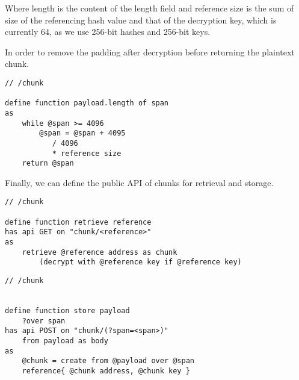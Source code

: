 Where length is the content of the length field and reference  size is the sum of size of the referencing hash value and that of the decryption key, which is currently 64, as we use 256-bit hashes and 256-bit keys.

In order to remove the padding after decryption before returning the plaintext chunk. 

\begin{definition}\label{def:span}
\begin{lstlisting}[language=buzz1]
// /chunk

define function payload.length of span
as
    while @span >= 4096 
        @span = @span + 4095
           / 4096
           * reference size
    return @span
\end{lstlisting}
\end{definition}

Finally, we can define the public API of chunks  for retrieval and storage.

\begin{definition}\label{def:retrieve}
\begin{lstlisting}[language=buzz1]
// /chunk

define function retrieve reference
has api GET on "chunk/<reference>"
as 
    retrieve @reference address as chunk
        (decrypt with @reference key if @reference key)
\end{lstlisting}
\end{definition}


\begin{definition} \label{def:store}
\begin{lstlisting}[language=buzz1]
// /chunk


define function store payload
    ?over span 
has api POST on "chunk/(?span=<span>)"
    from payload as body
as 
    @chunk = create from @payload over @span
    reference{ @chunk address, @chunk key }
\end{lstlisting}
\end{definition}


